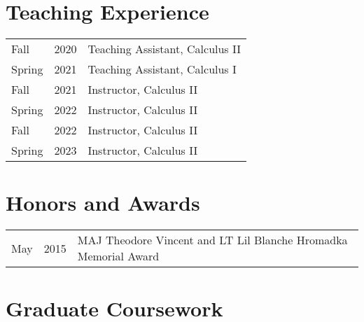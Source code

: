 \documentclass[margin,line,pifont,palatino,courier]{res}
\begin{document}
\begin{resume}


\section{\sc Teaching Experience}

\begin{tabular}{@{}p{0.4in}p{0.3in}p{4in}}
Fall & 2020 & Teaching Assistant, Calculus II\\
Spring & 2021 & Teaching Assistant, Calculus I\\
Fall & 2021 & Instructor, Calculus II\\
Spring & 2022 & Instructor, Calculus II\\
Fall & 2022 & Instructor, Calculus II\\
Spring & 2023 & Instructor, Calculus II\\
\end{tabular}



\section{\sc Honors and Awards}

\begin{tabular}{@{}p{0.4in}p{0.3in}p{4in}}
May & 2015 & MAJ Theodore Vincent and LT Lil Blanche Hromadka Memorial Award\\
\end{tabular}







\section{\sc Graduate Coursework}


\end{resume}
\end{document}
